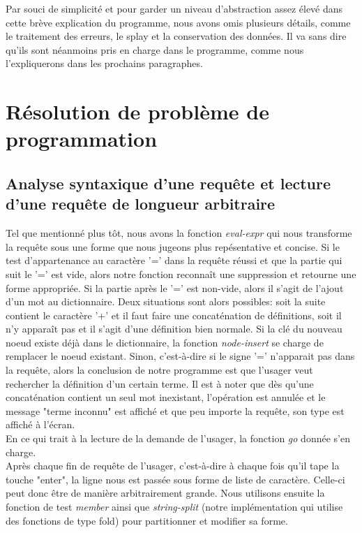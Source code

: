 \documentclass[french]{article}
\begin{document}
			
			Par souci de simplicité et pour garder un niveau d’abstraction 
			assez élevé dans cette brève explication du programme,
		nous avons omis plusieurs détails, comme le traitement des erreurs, le 
		splay et la conservation des données. Il va sans dire qu’ils sont
		néanmoins pris en charge dans le programme, comme nous l’expliquerons dans les prochains paragraphes.		
		
	\section{Résolution de problème de programmation}
		\subsection{Analyse syntaxique d’une requête et lecture d’une requête 
		de longueur arbitraire}
			Tel que mentionné plus tôt, nous avons la fonction 
			\textit{eval-expr} qui nous transforme la requête sous une forme 
			que nous jugeons plus repésentative et concise. Si le test 
			d'appartenance au caractère '=' dans la requête réussi et que la 
			partie qui suit le '=' est vide, alors notre fonction reconnaît 
			une suppression et retourne une forme appropriée. Si la partie 
			après le '=' est non-vide, alors il s'agit
		de l'ajout d'un mot au dictionnaire. Deux situations sont alors possibles: soit la suite contient le caractère '+' et il faut faire
		une concaténation de définitions, soit il n'y apparaît pas et il 
		s'agit d'une définition bien normale. Si la clé du nouveau noeud 
		existe déjà dans le dictionnaire, la fonction \textit{node-insert} se 
		charge de remplacer le noeud existant. Sinon, c'est-à-dire si le signe 
		'=' n'apparait pas dans la requête, alors la conclusion de notre 
		programme est que l'usager veut rechercher la définition d'un certain 
		terme. Il est à noter que dès qu'une concaténation contient un seul 
		mot inexistant, l'opération est annulée et le message "terme inconnu" 
		est affiché et que peu importe
		la requête, son type est affiché à l'écran. \\
			
			En ce qui trait à la lecture de la demande de l'usager, la 
			fonction \textit{go} donnée s'en charge.\\
			
		Après chaque fin de requête de l'usager, c'est-à-dire à chaque fois qu'il tape la touche "enter", la ligne nous est passée sous forme
		de liste de caractère. Celle-ci peut donc être de manière 
		arbitrairement grande. Nous utilisons ensuite la fonction de test 
		\textit{member} ainsi que \textit{string-split} (notre implémentation 
		qui utilise des fonctions de type fold) pour partitionner 
		et modifier sa forme. \\
		
\end{document}

